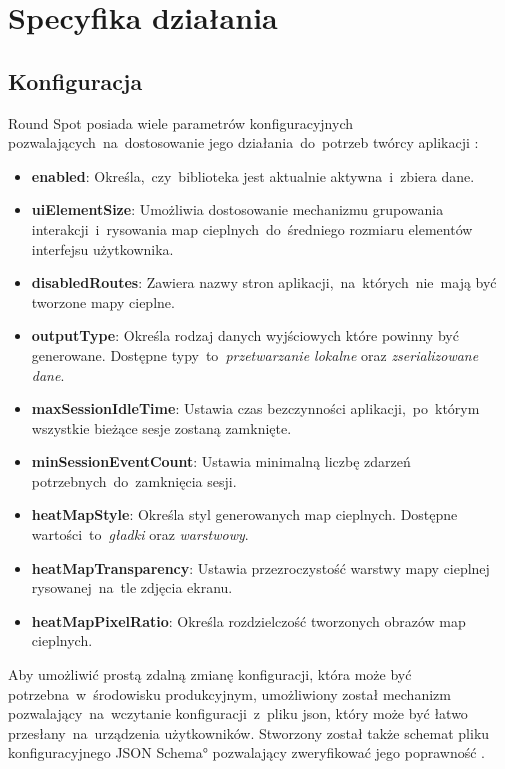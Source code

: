 \section{Specyfika działania}

\subsection{Konfiguracja}
\label{sec:rs_config}
Round Spot posiada wiele parametrów konfiguracyjnych pozwalających~na~dostosowanie jego działania~do~potrzeb twórcy aplikacji \cite{RoundSpot_Config_Docs}:
\begin{itemize}
	\item {\bf enabled}: Określa,~czy~biblioteka jest aktualnie aktywna~i~zbiera dane.
	\item {\bf uiElementSize}: Umożliwia dostosowanie mechanizmu grupowania interakcji~i~rysowania map cieplnych~do~średniego rozmiaru elementów interfejsu użytkownika.
	\item {\bf disabledRoutes}: Zawiera nazwy stron aplikacji,~na~których~nie~mają być tworzone mapy cieplne.
	\item {\bf outputType}: Określa rodzaj danych wyjściowych które powinny być generowane. Dostępne typy~to~{\it przetwarzanie lokalne} oraz {\it zserializowane dane}.
	\item {\bf maxSessionIdleTime}: Ustawia czas bezczynności aplikacji,~po~którym wszystkie bieżące sesje zostaną zamknięte.
	\item {\bf minSessionEventCount}: Ustawia minimalną liczbę zdarzeń potrzebnych~do~zamknięcia sesji.
	\item {\bf heatMapStyle}: Określa styl generowanych map cieplnych. Dostępne wartości~to~{\it gładki} oraz {\it warstwowy}.
	\item {\bf heatMapTransparency}: Ustawia przezroczystość warstwy mapy cieplnej rysowanej~na~tle zdjęcia ekranu. 
	\item {\bf heatMapPixelRatio}: Określa rozdzielczość tworzonych obrazów map cieplnych.
\end{itemize}

Aby umożliwić prostą zdalną zmianę konfiguracji, która może być potrzebna~w~środowisku produkcyjnym, umożliwiony został mechanizm pozwalający~na~wczytanie konfiguracji~z~pliku json, który może być łatwo przesłany~na~urządzenia użytkowników. Stworzony został także schemat pliku konfiguracyjnego \ang{JSON Schema} pozwalający zweryfikować jego poprawność \cite{RoundSpot_Config_Schema}.

